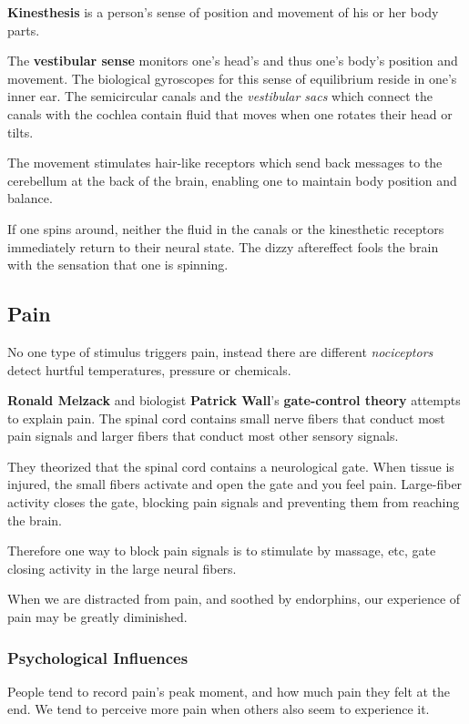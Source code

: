 \documentclass[12pt]{article}
\begin{document}
\textbf{Kinesthesis} is a person's sense of position and movement of his or her body parts.

The \textbf{vestibular sense} monitors one's head's and thus one's body's position and movement. The biological gyroscopes for this sense of equilibrium reside in one's inner ear. The semicircular canals and the \textit{vestibular sacs} which connect the canals with the cochlea contain fluid that moves when one rotates their head or tilts.

The movement stimulates hair-like receptors which send back messages to the cerebellum at the back of the brain, enabling one to maintain body position and balance.

If one spins around, neither the fluid in the canals or the kinesthetic receptors immediately return to their neural state. The dizzy aftereffect fools the brain with the sensation that one is spinning.

\subsection*{Pain}
No one type of stimulus triggers pain, instead there are different \textit{nociceptors} detect hurtful temperatures, pressure or chemicals.

{\bf Ronald Melzack} and biologist {\bf Patrick Wall}'s \textbf{gate-control theory} attempts to explain pain. The spinal cord contains small nerve fibers that conduct most pain signals and larger fibers that conduct most other sensory signals.

They theorized that the spinal cord contains a neurological gate. When tissue is injured, the small fibers activate and open the gate and you feel pain. Large-fiber activity closes the gate, blocking pain signals and preventing them from reaching the brain.

Therefore one way to block pain signals is to stimulate by massage, etc, gate closing activity in the large neural fibers.

When we are distracted from pain, and soothed by endorphins, our experience of pain may be greatly diminished.

\subsubsection*{Psychological Influences}
People tend to record pain's peak moment, and how much pain they felt at the end. We tend to perceive more pain when others also seem to experience it.
\end{document}
